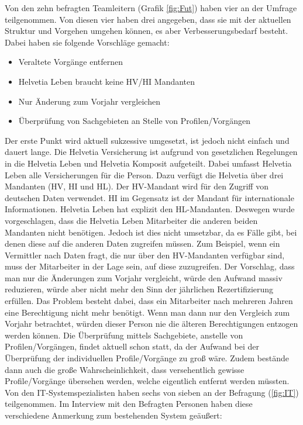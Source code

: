 \newpage
Von den zehn befragten Teamleitern (Grafik \ref{fig:Fut}) haben vier an der Umfrage teilgenommen.
Von diesen vier haben drei angegeben, dass sie mit der aktuellen Struktur und Vorgehen umgehen können, es aber Verbesserungsbedarf besteht.
Dabei haben sie folgende Vorschläge gemacht:

\begin{itemize}
	\item Veraltete Vorgänge entfernen
	\item Helvetia Leben braucht keine HV/HI Mandanten
	\item Nur Änderung zum Vorjahr vergleichen
	\item Überprüfung von Sachgebieten an Stelle von Profilen/Vorgängen
\end{itemize}

Der erste Punkt wird aktuell sukzessive umgesetzt, ist jedoch nicht einfach und dauert lange.
Die Helvetia Versicherung ist aufgrund von gesetzlichen Regelungen in die Helvetia Leben und Helvetia Komposit aufgeteilt.
Dabei umfasst Helvetia Leben alle Versicherungen für die Person.
Dazu verfügt die Helvetia über drei Mandanten (HV, HI und HL).
Der HV-Mandant wird für den Zugriff von deutschen Daten verwendet.
HI im Gegensatz ist der Mandant für internationale Informationen.
Helvetia Leben hat explizit den HL-Mandanten.
Deswegen wurde vorgeschlagen, dass die Helvetia Leben Mitarbeiter die anderen beiden Mandanten nicht benötigen.
Jedoch ist dies nicht umsetzbar, da es Fälle gibt, bei denen diese auf die anderen Daten zugreifen müssen.
Zum Beispiel, wenn ein Vermittler nach Daten fragt, die nur über den HV-Mandanten verfügbar sind, muss der Mitarbeiter in der Lage sein, auf diese zuzugreifen.
\newline
Der Vorschlag, dass man nur die Änderungen zum Vorjahr vergleicht, würde den Aufwand massiv reduzieren, würde aber nicht mehr den Sinn der jährlichen Rezertifizierung erfüllen.
Das Problem besteht dabei, dass ein Mitarbeiter nach mehreren Jahren eine Berechtigung nicht mehr benötigt.
Wenn man dann nur den Vergleich zum Vorjahr betrachtet, würden dieser Person nie die älteren Berechtigungen entzogen werden können.
\newline
Die Überprüfung mittels Sachgebiete, anstelle von Profilen/Vorgängen, findet aktuell schon statt, da der Aufwand bei der Überprüfung der individuellen Profile/Vorgänge zu groß wäre.
Zudem bestände dann auch die große Wahrscheinlichkeit, dass versehentlich gewisse Profile/Vorgänge übersehen werden, welche eigentlich entfernt werden müssten.
\newline
\newline
Von den IT-Systemspezialisten haben sechs von sieben an der Befragung (\ref{fig:IT}) teilgenommen.
Im Interview mit den Befragten Personen haben diese verschiedene Anmerkung zum bestehenden System geäußert:

